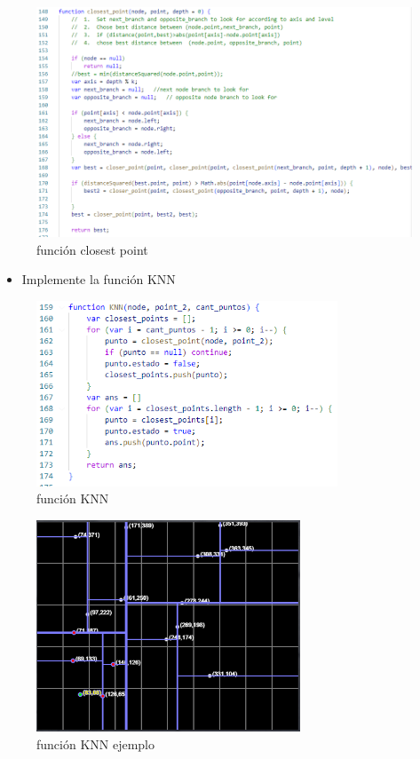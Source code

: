 \documentclass{article}
\begin{document}
\begin{enumerate}
\begin{figure}[H]
\centering
\includegraphics[width=1\textwidth]{Img/closest_point.png}
\caption{función closest point}
\end{figure}

\begin{itemize}
   \item Implemente la función KNN
\end{itemize}

\begin{figure}[H]
\centering
\includegraphics[width=0.8\textwidth]{Img/KNN_kdtree.png}
\caption{función KNN}
\end{figure}

\begin{figure}[H]
\centering
\includegraphics[width=0.7\textwidth]{Img/KNN_kdtree_ej.png}
\caption{función KNN ejemplo}
\end{figure}


\end{enumerate}
\end{document}
